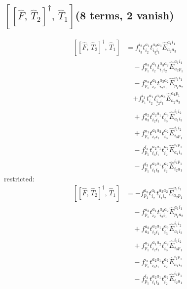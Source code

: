 \documentclass[11pt]{article}
\begin{document}
\subsection*{$\left[\left[\hat{F},\, \hat{T}_{2}\right]^{\dagger},\, \hat{T}_{1}\right]$\quad(8 terms, 2 vanish)}
\begin{align}
\left[\left[\hat{F},\, \hat{T}_{2}\right]^{\dagger},\, \hat{T}_{1}\right] &= \underline{f^{i_{2}}_{i_{3}} t^{a_{1}}_{i_{2}} t^{a_{2}a_{3}}_{i_{3}i_{1}} \hat{E}^{a_{1}i_{1}}_{a_{2}a_{3}}} \\
&\quad - f^{a_{3}}_{p_{1}} t^{a_{1}}_{i_{2}} t^{a_{3}a_{2}}_{i_{1}i_{2}} \hat{E}^{a_{1}i_{1}}_{a_{2}p_{1}} \\
&\quad - f^{a_{3}}_{p_{1}} t^{a_{1}}_{i_{2}} t^{a_{3}a_{2}}_{i_{2}i_{1}} \hat{E}^{a_{1}i_{1}}_{p_{1}a_{2}} \\
&\quad \underline{+ f^{i_{1}}_{p_{1}} t^{a_{1}}_{i_{2}} t^{a_{2}a_{3}}_{i_{2}i_{1}} \hat{E}^{a_{1}p_{1}}_{a_{2}a_{3}}} \\
&\quad + f^{a_{2}}_{a_{3}} t^{a_{2}a_{1}}_{i_{2}i_{1}} t^{a_{3}}_{i_{3}} \hat{E}^{i_{1}i_{2}}_{a_{1}i_{3}} \\
&\quad + f^{a_{1}}_{p_{1}} t^{a_{1}a_{2}}_{i_{2}i_{1}} t^{a_{2}}_{i_{3}} \hat{E}^{i_{1}i_{2}}_{i_{3}p_{1}} \\
&\quad - f^{i_{3}}_{p_{1}} t^{a_{2}a_{1}}_{i_{3}i_{1}} t^{a_{2}}_{i_{2}} \hat{E}^{i_{1}p_{1}}_{a_{1}i_{2}} \\
&\quad - f^{i_{3}}_{p_{1}} t^{a_{2}a_{1}}_{i_{1}i_{3}} t^{a_{2}}_{i_{2}} \hat{E}^{i_{1}p_{1}}_{i_{2}a_{1}}
\end{align}
restricted:
\begin{align}
\left[\left[\hat{F},\, \hat{T}_{2}\right]^{\dagger},\, \hat{T}_{1}\right] &= - f^{a_{3}}_{p_{1}} t^{a_{1}}_{i_{2}} t^{a_{3}a_{2}}_{i_{1}i_{2}} \hat{E}^{a_{1}i_{1}}_{a_{2}p_{1}} \\
&\quad - f^{a_{3}}_{p_{1}} t^{a_{1}}_{i_{2}} t^{a_{3}a_{2}}_{i_{2}i_{1}} \hat{E}^{a_{1}i_{1}}_{p_{1}a_{2}} \\
&\quad + f^{a_{2}}_{a_{3}} t^{a_{2}a_{1}}_{i_{2}i_{1}} t^{a_{3}}_{i_{3}} \hat{E}^{i_{1}i_{2}}_{a_{1}i_{3}} \\
&\quad + f^{a_{1}}_{p_{1}} t^{a_{1}a_{2}}_{i_{2}i_{1}} t^{a_{2}}_{i_{3}} \hat{E}^{i_{1}i_{2}}_{i_{3}p_{1}} \\
&\quad - f^{i_{3}}_{p_{1}} t^{a_{2}a_{1}}_{i_{3}i_{1}} t^{a_{2}}_{i_{2}} \hat{E}^{i_{1}p_{1}}_{a_{1}i_{2}} \\
&\quad - f^{i_{3}}_{p_{1}} t^{a_{2}a_{1}}_{i_{1}i_{3}} t^{a_{2}}_{i_{2}} \hat{E}^{i_{1}p_{1}}_{i_{2}a_{1}}
\end{align}
\end{document}
